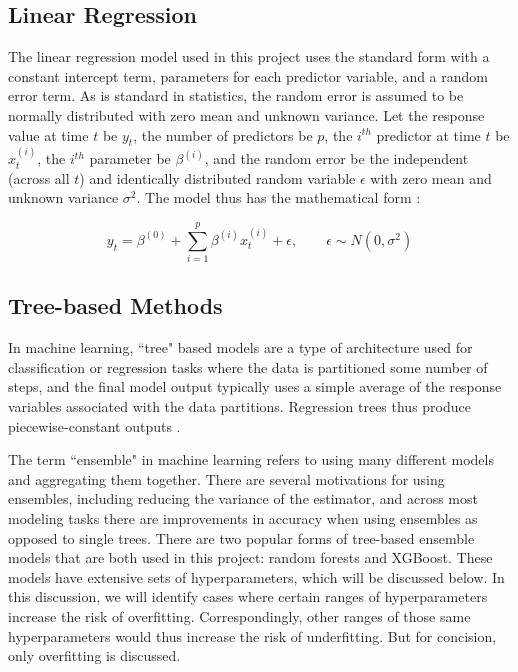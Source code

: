
\subsection{Linear Regression}

The linear regression model used in this project uses the standard form with a constant intercept term, parameters for each predictor variable, and a random error term. As is standard in statistics, the random error is assumed to be normally distributed with zero mean and unknown variance. Let the response value at time $t$ be $y_t$, the number of predictors be $p$, the $i^{th}$ predictor at time $t$ be $x^{(i)}_t$, the $i^{th}$ parameter be $\beta^{(i)}$, and the random error be the  independent (across all $t$) and identically distributed random variable $\epsilon$ with zero mean and unknown variance $\sigma^2$. The model thus has the mathematical form \citep[p.\ 44]{Hastie-2010-ESL}:

\[
y_t = \beta^{(0)} + \sum_{i=1}^p \beta^{(i)} x^{(i)}_t + \epsilon, \qquad \epsilon\sim N(0, \sigma^2)
\]

\subsection{Tree-based Methods}

In machine learning, ``tree" based models are a type of architecture used for classification or regression tasks where the data is partitioned some number of steps, and the final model output typically uses a simple average of the response variables associated with the data partitions. Regression trees thus produce piecewise-constant outputs \citep[Chap.\ 10]{Hastie-2010-ESL}.

The term ``ensemble" in machine learning refers to using many different models and aggregating them together. There are several motivations for using ensembles, including reducing the variance of the estimator, and across most modeling tasks there are improvements in accuracy when using ensembles as opposed to single trees. There are two popular forms of tree-based ensemble models that are both used in this project: random forests and XGBoost. These models have extensive sets of hyperparameters, which will be discussed below. In this discussion, we will identify cases where certain ranges of hyperparameters increase the risk of overfitting. Correspondingly, other ranges of those same hyperparameters would thus increase the risk of underfitting. But for concision, only overfitting is discussed.

